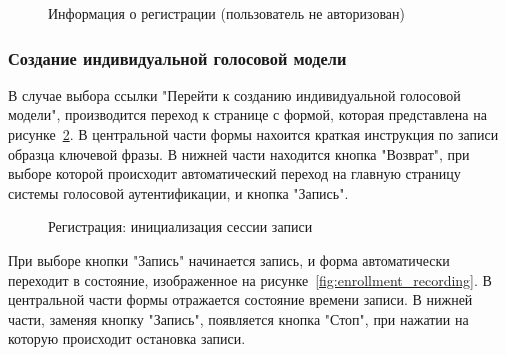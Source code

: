 \begin{figure}[hbt!]
\caption{Информация о регистрации (пользователь не авторизован)}
\label{fig:enrollment_initial_anonymous}
\end{figure}

\subsubsection{Создание индивидуальной голосовой модели}
\label{sec:manual:enrollment}

В случае выбора ссылки "Перейти к созданию индивидуальной голосовой модели", производится переход к странице с формой, которая представлена на рисунке~\ref{fig:enrollment_created}. В центральной части формы нахоится краткая инструкция по записи образца ключевой фразы. В нижней части находится кнопка "Возврат", при выборе которой происходит автоматический переход на главную страницу системы голосовой аутентификации, и кнопка "Запись".


\begin{figure}[hbt!]
\caption{Регистрация: инициализация сессии записи}
\label{fig:enrollment_created}
\end{figure}

При выборе кнопки "Запись" начинается запись, и форма  автоматически переходит в состояние, изображенное на рисунке~\ref{fig:enrollment_recording}. В центральной части формы отражается состояние времени записи. В нижней части, заменяя кнопку "Запись", появляется кнопка "Стоп", при нажатии на которую происходит остановка записи.


